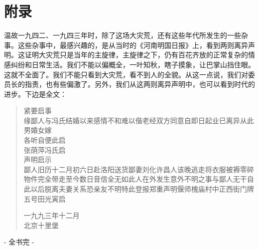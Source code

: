 \fancyhead[RO]{\thepage} %
\fancyhead[LE]{\thepage} %
\fancyfoot[LE,RO]{}
\fancyfoot[LO,CE]{}
\fancyfoot[CO,RE]{}
\chapter*{附录}
温故一九四二、一九四三年时，除了这场大灾荒，还有这些年代所发生的一些杂事。这些杂事中，最感兴趣的，是从当时的《河南明国日报》上，看到两则离异声明。这证明大灾荒只是当年的主旋律，主旋律之下，仍有百花齐放的正常复杂的情感纠纷和日常生活。我们不能以偏概全，一叶知秋，瞎子摸象，让巴掌山挡住眼。这就不全面了。我们不能只看到大灾荒，看不到人的全貌。从这一点说，我们对委员长的指责，也有些偏激了。另外，我们从这两则离异声明中，也可以看到时代的进步。下边是全文：\\

\begin{quote}
	紧要启事\\

缘鄙人与冯氏结婚以来感情不和难以偕老经双方同意自即日起业已离异从此男婚女嫁\\

各听自便此启\\

张荫萍冯氏启\\

声明启示\\

鄙人旧历十二月初六日赴洛阳送货鄙妻刘化许昌人该晚逃走将衣服被褥零碎物件完全带走至今数日音信全无如此人在外发生意外不明之事与鄙人无干自此以后脱离夫妻关系恐亲友不明特此登报郑重声明偃师槐庙村中正西街门牌五号田光寅启\\

\begin{flushright}
	一九九三年十二月\\
	北京十里堡\\
\end{flushright}
\end{quote}

\begin{center}
	- 全书完 -
\end{center}